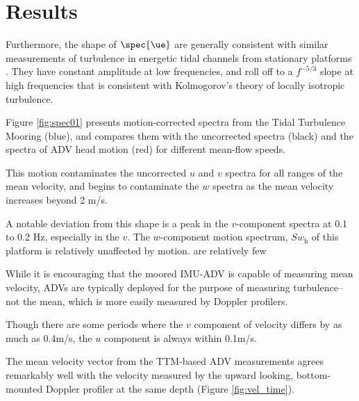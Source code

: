 \section{Results}

Furthermore, the shape of $\spec{\ue}$ are generally consistent with similar measurements of turbulence in energetic tidal channels from stationary platforms \citep[]{Thomson++2010} . They have constant amplitude at low frequencies, and roll off to a $f^{-5/3}$ slope at high frequencies that is consistent with Kolmogorov's theory of locally isotropic turbulence. 

Figure \ref{fig:spec01} presents motion-corrected spectra from the Tidal Turbulence Mooring (blue), and compares them with the uncorrected spectra (black) and the spectra of ADV head motion (red) for different mean-flow speeds.  

This motion contaminates the uncorrected $u$ and $v$ spectra for all ranges of the mean velocity, and begins to contaminate the $w$ spectra as the mean velocity increases beyond 2 m/s. 

A notable deviation from this shape is a peak in the $v$-component spectra at 0.1 to 0.2 Hz, especially in the $v$. The $w$-component motion spectrum, $S{w_\mathrm{h}}$ of this platform is relatively unaffected by motion. are relatively few 

While it is encouraging that the moored IMU-ADV is capable of measuring mean velocity, ADVs are typically deployed for the purpose of measuring turbulence--not the mean, which is more easily measured by Doppler profilers. 

Though there are some periods where the $v$ component of velocity differs by as much as 0.4m/s, the $u$ component is always within 0.1m/s.

The mean velocity vector from the TTM-based ADV measurements agrees remarkably well with the velocity measured by the upward looking, bottom-mounted Doppler profiler at the same depth (Figure \ref{fig:vel_time}). 

